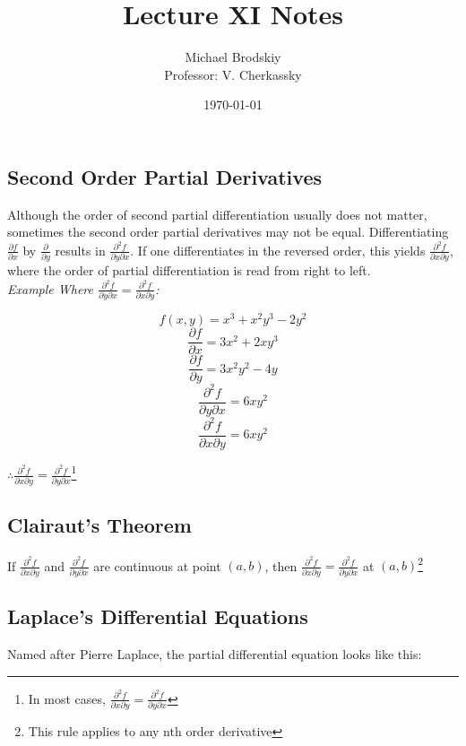 \documentclass[12pt]{article}
\title{Lecture XI Notes}
\date{\today}
\author{Michael Brodskiy\\ \small Professor: V. Cherkassky}
\begin{document}
\maketitle

\subsection{Second Order Partial Derivatives}

Although the order of second partial differentiation usually does not matter, sometimes the second order partial derivatives may not be equal. Differentiating $\frac{\partial f}{\partial x}$ by $\frac{\partial}{\partial y}$ results in $\frac{\partial^2f}{\partial y \partial x}$. If one differentiates in the reversed order, this yields $\frac{\partial^2f}{\partial x \partial y}$, where the order of partial differentiation is read from right to left.\\

\textit{Example Where $\frac{\partial^2f}{\partial y \partial x}=\frac{\partial^2f}{\partial x \partial y}$:}

$$f(x,y)=x^3+x^2y^3-2y^2$$
$$\frac{\partial f}{\partial x}=3x^2+2xy^3$$
$$\frac{\partial f}{\partial y}=3x^2y^2-4y$$
$$\frac{\partial^2f}{\partial y \partial x}=6xy^2$$
$$\frac{\partial^2f}{\partial x \partial y}=6xy^2$$
\begin{center}$\therefore \frac{\partial^2f}{\partial x \partial y}=\frac{\partial^2f}{\partial y \partial x}$\footnote{In most cases, $\frac{\partial^2f}{\partial x \partial y}=\frac{\partial^2f}{\partial y \partial x}$}\end{center}

\subsection{Clairaut's Theorem}

If $\frac{\partial^2f}{\partial x \partial y}$ and $\frac{\partial^2f}{\partial y \partial x}$ are continuous at point $(a, b)$, then $\frac{\partial^2f}{\partial x \partial y}=\frac{\partial^2f}{\partial y \partial x}$ at $(a, b)$\footnote{This rule applies to any nth order derivative}

\subsection{Laplace's Differential Equations}

Named after Pierre Laplace, the partial differential equation looks like this:
\end{document}
